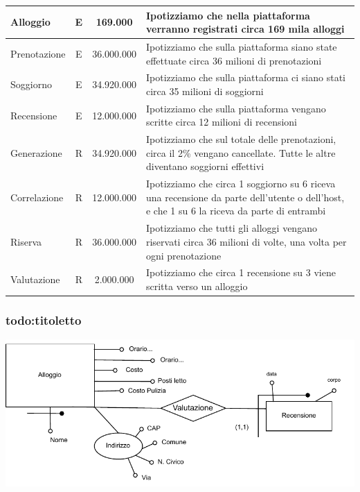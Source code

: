 \begin{longtable}{|l|c|c|p{6.3cm}|}
    \endlastfoot
    Alloggio                 & E             & 169.000         & {Ipotizziamo che nella piattaforma verranno registrati circa 169 mila alloggi}                                                               \\\hline
    Prenotazione             & E             & 36.000.000      & {Ipotizziamo che sulla piattaforma siano state effettuate circa 36 milioni di prenotazioni}                                                  \\\hline
    Soggiorno                & E             & 34.920.000      & {Ipotizziamo che sulla piattaforma ci siano stati circa 35 milioni di soggiorni}                                                             \\\hline
    Recensione               & E             & 12.000.000      & {Ipotizziamo che sulla piattaforma vengano scritte circa 12 milioni di recensioni}                                                           \\\hline
    Generazione              & R             & 34.920.000      & {Ipotizziamo che sul totale delle prenotazioni, circa il 2\% vengano cancellate. Tutte le altre diventano soggiorni effettivi}               \\\hline
    Correlazione             & R             & 12.000.000      & {Ipotizziamo che circa 1 soggiorno su 6 riceva una recensione da parte dell'utente o dell'host, e che 1 su 6 la riceva da parte di entrambi} \\\hline
    Riserva                  & R             & 36.000.000      & {Ipotizziamo che tutti gli alloggi vengano riservati circa 36 milioni di volte, una volta per ogni prenotazione}                             \\\hline
    Valutazione              & R             & 2.000.000       & {Ipotizziamo che circa 1 recensione su 3 viene scritta verso un alloggio}                                                                    \\\hline
\end{longtable}
\normalsize

\subsubsection{todo:titoletto}
\includegraphics[width=\textwidth]{resources/page5.pdf}

